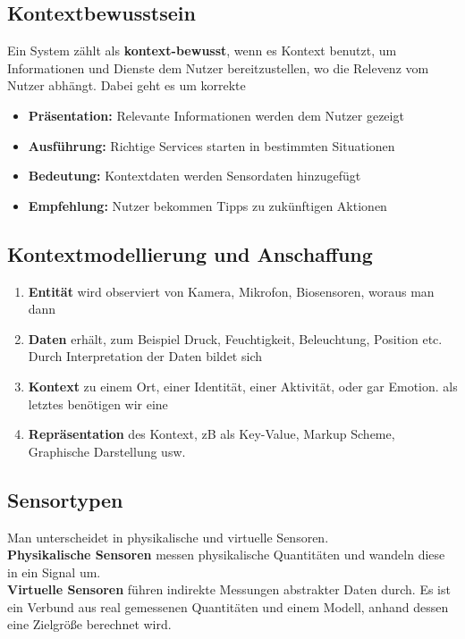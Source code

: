 \documentclass[a4paper]{article}
\begin{document}
\subsection{Kontextbewusstsein}
Ein System zählt als \textbf{kontext-bewusst}, wenn es Kontext benutzt, um Informationen und Dienste dem Nutzer bereitzustellen, wo die Relevenz vom Nutzer abhängt. Dabei geht es um korrekte
\begin{itemize}
	\item \textbf{Präsentation:} Relevante Informationen werden dem Nutzer gezeigt
	\item \textbf{Ausführung:} Richtige Services starten in bestimmten Situationen
	\item \textbf{Bedeutung:} Kontextdaten werden Sensordaten hinzugefügt
	\item \textbf{Empfehlung:} Nutzer bekommen Tipps zu zukünftigen Aktionen
\end{itemize}

\subsection{Kontextmodellierung und Anschaffung}
\begin{enumerate}
	\item \textbf{Entität} wird observiert von Kamera, Mikrofon, Biosensoren, woraus man dann
	\item \textbf{Daten} erhält, zum Beispiel Druck, Feuchtigkeit, Beleuchtung, Position etc. Durch Interpretation der Daten bildet sich
	\item \textbf{Kontext} zu einem Ort, einer Identität, einer Aktivität, oder gar Emotion. als letztes benötigen wir eine
	\item \textbf{Repräsentation} des Kontext, zB als Key-Value, Markup Scheme, Graphische Darstellung usw.
\end{enumerate}
\subsection{Sensortypen}
Man unterscheidet in {physikalische} und {virtuelle} Sensoren.\\

\textbf{Physikalische Sensoren} messen physikalische Quantitäten und wandeln diese in ein Signal um.\\
\textbf{Virtuelle Sensoren} führen indirekte Messungen abstrakter Daten durch. Es ist ein Verbund aus real gemessenen Quantitäten und einem Modell, anhand dessen eine Zielgröße berechnet wird.\\
\end{document}
